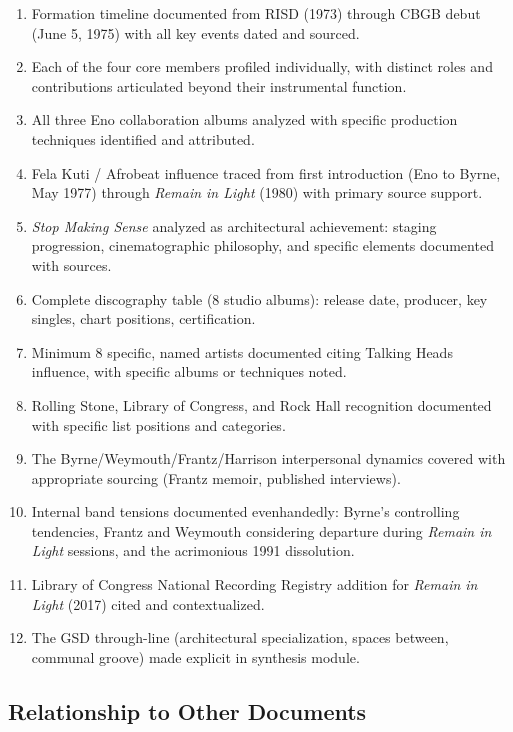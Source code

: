 \documentclass[11pt,letterpaper]{article}
\begin{document}
\begin{enumerate}
  \item Formation timeline documented from RISD (1973) through CBGB debut (June 5, 1975) with all key events dated and sourced.
  \item Each of the four core members profiled individually, with distinct roles and contributions articulated beyond their instrumental function.
  \item All three Eno collaboration albums analyzed with specific production techniques identified and attributed.
  \item Fela Kuti / Afrobeat influence traced from first introduction (Eno to Byrne, May 1977) through \textit{Remain in Light} (1980) with primary source support.
  \item \textit{Stop Making Sense} analyzed as architectural achievement: staging progression, cinematographic philosophy, and specific elements documented with sources.
  \item Complete discography table (8 studio albums): release date, producer, key singles, chart positions, certification.
  \item Minimum 8 specific, named artists documented citing Talking Heads influence, with specific albums or techniques noted.
  \item Rolling Stone, Library of Congress, and Rock Hall recognition documented with specific list positions and categories.
  \item The Byrne/Weymouth/Frantz/Harrison interpersonal dynamics covered with appropriate sourcing (Frantz memoir, published interviews).
  \item Internal band tensions documented evenhandedly: Byrne's controlling tendencies, Frantz and Weymouth considering departure during \textit{Remain in Light} sessions, and the acrimonious 1991 dissolution.
  \item Library of Congress National Recording Registry addition for \textit{Remain in Light} (2017) cited and contextualized.
  \item The GSD through-line (architectural specialization, spaces between, communal groove) made explicit in synthesis module.
\end{enumerate}

\subsection{Relationship to Other Documents}
\end{document}
